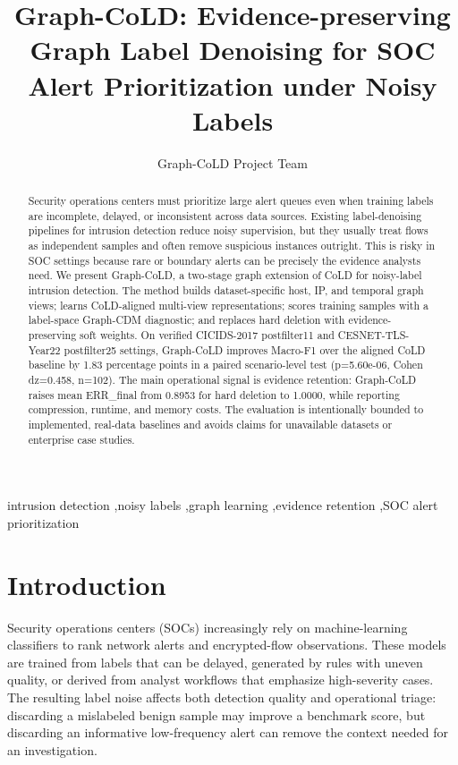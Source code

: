 \documentclass[preprint,review,12pt]{elsarticle}
\title{Graph-CoLD: Evidence-preserving Graph Label Denoising for SOC Alert Prioritization under Noisy Labels}
\author{Graph-CoLD Project Team}
\begin{document}
\begin{frontmatter}
\maketitle
\begin{abstract}
Security operations centers must prioritize large alert queues even when training
labels are incomplete, delayed, or inconsistent across data sources. Existing
label-denoising pipelines for intrusion detection reduce noisy supervision, but
they usually treat flows as independent samples and often remove suspicious
instances outright. This is risky in SOC settings because rare or boundary
alerts can be precisely the evidence analysts need. We present Graph-CoLD, a
two-stage graph extension of CoLD for noisy-label intrusion detection. The method
builds dataset-specific host, IP, and temporal graph views; learns CoLD-aligned
multi-view representations; scores training samples with a label-space
Graph-CDM diagnostic; and replaces hard deletion with evidence-preserving soft
weights. On verified CICIDS-2017 postfilter11 and CESNET-TLS-Year22 postfilter25
settings, Graph-CoLD improves Macro-F1 over the aligned CoLD baseline by
1.83 percentage points in a paired scenario-level test
(p=5.60e-06, Cohen dz=0.458,
n=102). The main operational signal is evidence retention:
Graph-CoLD raises mean ERR\_final from 0.8953 for hard
deletion to 1.0000, while reporting compression, runtime,
and memory costs. The evaluation is intentionally bounded to implemented,
real-data baselines and avoids claims for unavailable datasets or enterprise
case studies.
\end{abstract}
\begin{keyword}
intrusion detection \sep noisy labels \sep graph learning \sep evidence retention \sep SOC alert prioritization
\end{keyword}
\end{frontmatter}

\section{Introduction}
Security operations centers (SOCs) increasingly rely on machine-learning
classifiers to rank network alerts and encrypted-flow observations. These models
are trained from labels that can be delayed, generated by rules with uneven
quality, or derived from analyst workflows that emphasize high-severity cases.
The resulting label noise affects both detection quality and operational triage:
discarding a mislabeled benign sample may improve a benchmark score, but
discarding an informative low-frequency alert can remove the context needed for
an investigation.
\end{document}

